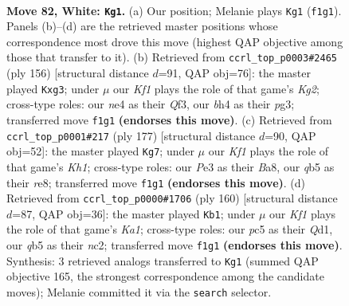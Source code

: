 \documentclass[11pt]{article}
\begin{document}
\clearpage

\begin{figure}[p]\centering
\begin{subfigure}{0.46\textwidth}\centering
\resizebox{\linewidth}{!}{%
\newchessgame
\chessboard[
  setfen={8/6k1/8/Pqp2p2/3pnPpb/4P3/R1QB4/1r1N1K2 w - - 7 82},
  showmover=false,
  pgfstyle=straightmove, color=movearrow, markmove={f1-g1}
]}
\caption{}
\end{subfigure}\hfill
\begin{subfigure}{0.46\textwidth}\centering
\resizebox{\linewidth}{!}{%
\newchessgame
\chessboard[
  setfen={8/R5bk/4p3/1p1pr1P1/1P1B4/2P2Qp1/2q3K1/8 w - - 2 79},
  showmover=false,
  pgfstyle=straightmove, color=movearrow, markmove={g2-g3}
]}
\caption{}
\end{subfigure}
\\[4pt]
\begin{subfigure}{0.46\textwidth}\centering
\resizebox{\linewidth}{!}{%
\newchessgame
\chessboard[
  setfen={b3R2k/1q3p2/1p1r1b1p/7B/PN5P/5PP1/4Q3/6K1 b - - 2 89},
  showmover=false,
  pgfstyle=straightmove, color=movearrow, markmove={h8-g7}
]}
\caption{}
\end{subfigure}\hfill
\begin{subfigure}{0.46\textwidth}\centering
\resizebox{\linewidth}{!}{%
\newchessgame
\chessboard[
  setfen={8/8/1p1N1r1p/3P4/2P1pq2/Pp6/1Pn2k2/K2Q2R1 w - - 19 81},
  showmover=false,
  pgfstyle=straightmove, color=movearrow, markmove={a1-b1}
]}
\caption{}
\end{subfigure}
\caption{\textbf{Move 82, White: \texttt{Kg1}.} (a) Our position; Melanie plays \texttt{Kg1} (\texttt{f1g1}). Panels (b)--(d) are the retrieved master positions whose correspondence most drove this move (highest QAP objective among those that transfer to it). (b) Retrieved from \texttt{ccrl\_top\_p0003\#2465} (ply 156) [structural distance $d$=91, QAP obj=76]: the master played \texttt{Kxg3}; under $\mu$ our \emph{Kf1} plays the role of that game's \emph{Kg2}; cross-type roles: our \emph{n}e4 as their \emph{Q}f3, our \emph{b}h4 as their \emph{p}g3; transferred move \texttt{f1g1} \textbf{(endorses this move)}. (c) Retrieved from \texttt{ccrl\_top\_p0001\#217} (ply 177) [structural distance $d$=90, QAP obj=52]: the master played \texttt{Kg7}; under $\mu$ our \emph{Kf1} plays the role of that game's \emph{Kh1}; cross-type roles: our \emph{P}e3 as their \emph{B}a8, our \emph{q}b5 as their \emph{r}e8; transferred move \texttt{f1g1} \textbf{(endorses this move)}. (d) Retrieved from \texttt{ccrl\_top\_p0000\#1706} (ply 160) [structural distance $d$=87, QAP obj=36]: the master played \texttt{Kb1}; under $\mu$ our \emph{Kf1} plays the role of that game's \emph{Ka1}; cross-type roles: our \emph{p}c5 as their \emph{Q}d1, our \emph{q}b5 as their \emph{n}c2; transferred move \texttt{f1g1} \textbf{(endorses this move)}. Synthesis: 3 retrieved analogs transferred to \texttt{Kg1} (summed QAP objective 165, the strongest correspondence among the candidate moves); Melanie committed it via the \texttt{search} selector.}
\label{fig:thought-m162}
\end{figure}
\end{document}
